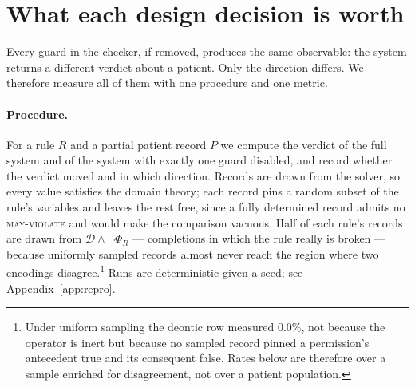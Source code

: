 %
%

\section{What each design decision is worth}
\label{sec:necessity}

Every guard in the checker, if removed, produces the same observable: the
system returns a different verdict about a patient. Only the direction differs.
We therefore measure all of them with one procedure and one metric.

\paragraph{Procedure.}
For a rule $R$ and a partial patient record $P$ we compute the verdict of the
full system and of the system with exactly one guard disabled, and record
whether the verdict moved and in which direction. Records are drawn from the
solver, so every value satisfies the domain theory; each record pins a random
subset of the rule's variables and leaves the rest free, since a fully
determined record admits no \textsc{may-violate} and would make the comparison
vacuous. Half of each rule's records are drawn from $\mathcal{D} \wedge \neg
\Phi_R$ --- completions in which the rule really is broken --- because
uniformly sampled records almost never reach the region where two encodings
disagree.\footnote{Under uniform sampling the deontic row measured $0.0\%$, not
because the operator is inert but because no sampled record pinned a
permission's antecedent true and its consequent false. Rates below are
therefore over a sample enriched for disagreement, not over a patient
population.} Runs are deterministic given a seed; see Appendix~\ref{app:repro}.

